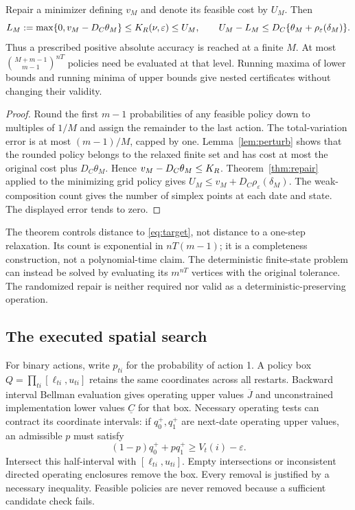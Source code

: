 \begin{theorem}\label{thm:lattice}
Repair a minimizer defining $v_M$ and denote its feasible cost by $U_M$. Then
\begin{equation}\label{eq:latticebracket}
 L_M:=\max\{0,v_M-D_C\theta_M\}\leq K_R(\nu,\varepsilon)\leq U_M,
 \qquad U_M-L_M\leq D_C\{\theta_M+\rho_\varepsilon(\delta_M)\}.
\end{equation}
Thus a prescribed positive absolute accuracy is reached at a finite $M$. At most
$\binom{M+m-1}{m-1}^{nT}$ policies need be evaluated at that level. Running maxima of lower bounds and running minima of upper bounds give nested certificates without changing their validity.
\end{theorem}
\begin{proof}
Round the first $m-1$ probabilities of any feasible policy down to multiples of $1/M$ and assign the remainder to the last action. The total-variation error is at most $(m-1)/M$, capped by one. Lemma~\ref{lem:perturb} shows that the rounded policy belongs to the relaxed finite set and has cost at most the original cost plus $D_C\theta_M$. Hence $v_M-D_C\theta_M\leq K_R$. Theorem~\ref{thm:repair} applied to the minimizing grid policy gives $U_M\leq v_M+D_C\rho_\varepsilon(\delta_M)$. The weak-composition count gives the number of simplex points at each date and state. The displayed error tends to zero.
\end{proof}

The theorem controls distance to \eqref{eq:target}, not distance to a one-step relaxation. Its count is exponential in $nT(m-1)$; it is a completeness construction, not a polynomial-time claim. The deterministic finite-state problem can instead be solved by evaluating its $m^{nT}$ vertices with the original tolerance. The randomized repair is neither required nor valid as a deterministic-preserving operation.

\subsection{The executed spatial search}\label{sec:spatial}
For binary actions, write $p_{ti}$ for the probability of action 1. A policy box $Q=\prod_{ti}[\ell_{ti},u_{ti}]$ retains the same coordinates across all restarts. Backward interval Bellman evaluation gives operating upper values $\overline J$ and unconstrained implementation lower values $\underline C$ for that box. Necessary operating tests can contract its coordinate intervals: if $q_0^+,q_1^+$ are next-date operating upper values, an admissible $p$ must satisfy
\begin{equation}\label{eq:cap}
 (1-p)q_0^++pq_1^+\geq V_t(i)-\varepsilon.
\end{equation}
Intersect this half-interval with $[\ell_{ti},u_{ti}]$. Empty intersections or inconsistent directed operating enclosures remove the box. Every removal is justified by a necessary inequality. Feasible policies are never removed because a sufficient candidate check fails.

